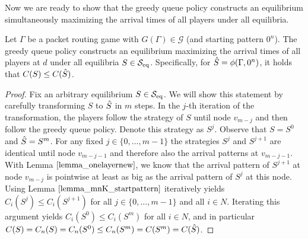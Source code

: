 Now we are ready to show that the greedy queue policy constructs an equilibrium simultaneously maximizing the arrival times of all players under all equilibria.
\begin{proposition}\label{prop_together}
Let $\Gamma$ be a packet routing game with $G(\Gamma)\in\mathcal{G}$ (and starting pattern $0^n$). The greedy queue policy constructs an equilibrium maximizing the arrival times of all players at $d$ under all equilibria $S \in \mathcal{S}_{\operatorname{eq}}$. Specifically, for $\hat{S}=\phi(\Gamma,0^n)$, it holds that $C(S) \leq C(\hat{S})$.
\end{proposition}
\begin{proof}
Fix an arbitrary equilibrium $S \in \mathcal{S}_{\operatorname{eq}}$.
We will show this statement by carefully transforming $S$ to $\hat{S}$ in $m$ steps.
In the $j$-th iteration of the transformation, the players follow the strategy of $S$ until node $v_{m-j}$ and then follow the greedy queue policy. Denote this strategy as $S^j$.
Observe that $S=S^0$ and $\hat{S}=S^m$.
For any fixed $j\in \{0,\ldots,m-1\}$ the strategies $S^j$ and $S^{j+1}$ are identical until node $v_{m-j-1}$ and therefore also the arrival patterns at $v_{m-j-1}$. With Lemma $\ref{lemma_onelayernew}$, we know that the arrival pattern of $S^{j+1}$ at node $v_{m-j}$ is pointwise at least as big as the arrival pattern of $S^{j}$ at this node. Using Lemma $\ref{lemma_mnK_startpattern}$ iteratively yields $C_i(S^j)\leq C_i(S^{j+1})$ for all $j\in \{0,\ldots,m-1\}$ and all $i\in N$. Iterating this argument yields $C_i(S^0) \leq C_i(S^m)$ for all $i\in N$, and in particular $C(S) = C_n(S) = C_n(S^0) \leq C_n(S^m)= C(S^m) = C(\hat{S})$. 
\end{proof}
%


